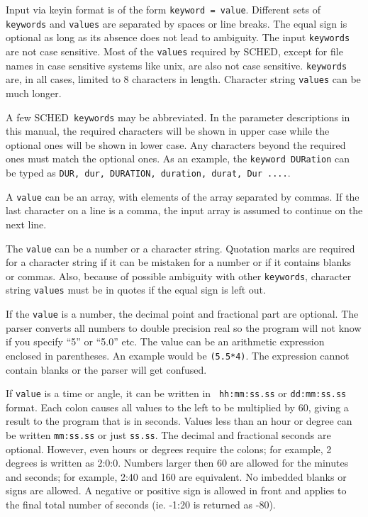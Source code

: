 \documentclass{report}
\newcommand{\sched}{{\sc SCHED}}
\newcommand{\schedb}{{\sc SCHED~}}
\begin{document}
Input via keyin format is of the form {\tt keyword = value}. Different
sets of {\tt keywords} and {\tt values} are separated by spaces or line
breaks. The equal sign is optional as long as its absence does not
lead to ambiguity.  The input {\tt keywords} are not case sensitive.
Most of the {\tt values} required by \sched, except for file
names in case sensitive systems like unix, are also not case
sensitive.  {\tt keywords} are, in all cases, limited to 8 characters
in length.  Character string {\tt values} can be much longer.

A few \schedb {\tt keywords} may be abbreviated.  In the parameter
descriptions in this manual, the required characters will be shown in
upper case while the optional ones will be shown in lower case.  Any
characters beyond the required ones must match the optional ones.  As
an example, the {\tt keyword DURation} can be typed as {\tt DUR, dur,
DURATION, duration, durat, Dur ....}.

A {\tt value} can be an array, with elements of the array separated by
commas. If the last character on a line is a comma, the input array is
assumed to continue on the next line.

The {\tt value} can be a number or a character string.  Quotation
marks are required for a character string if it can be mistaken for a
number or if it contains blanks or commas.  Also, because of possible
ambiguity with other {\tt keywords}, character string {\tt values}
must be in quotes if the equal sign is left out.

If the {\tt value} is a number, the decimal point and fractional part are
optional.  The parser converts all numbers to double precision real so
the program will not know if you specify ``5'' or ``5.0'' etc.  The
value can be an arithmetic expression enclosed in parentheses.  An
example would be {\tt (5.5*4)}.  The expression cannot contain
blanks or the parser will get confused.

If {\tt value} is a time or angle, it can be written in {\tt
hh:mm:ss.ss} or {\tt dd:mm:ss.ss} format. Each colon causes all values
to the left to be multiplied by 60, giving a result to the program
that is in seconds. Values less than an hour or degree can be written
{\tt mm:ss.ss} or just {\tt ss.ss}. The decimal and fractional seconds
are optional.  However, even hours or degrees require the colons; for
example, 2 degrees is written as 2:0:0. Numbers larger then 60 are
allowed for the minutes and seconds; for example, 2:40 and 160 are
equivalent.  No imbedded blanks or signs are allowed.  A negative
or positive sign is allowed in front and applies to the final total
number of seconds (ie. -1:20 is returned as -80).
\end{document}
